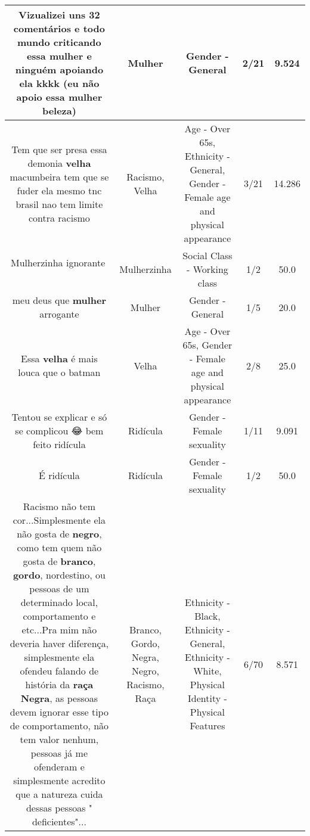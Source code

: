 \documentclass[11pt]{article}
\newlength\mylength
\begin{document}
\begin{center}
\begin{longtable}{|C{.65\mylength}|C{.30\mylength}|C{.12\mylength}|C{.12\mylength}|C{.12\mylength}|}
  \small Vizualizei uns 32 comentários e todo mundo criticando essa \textbf{mulher} e ninguém apoiando ela kkkk (eu não apoio essa \textbf{mulher} beleza)\normalsize   & Mulher & Gender - General & 2/21 & 9.524 \\  \hline
  \small Tem que ser presa essa demonia \textbf{v\textbf{elha}} macumbeira tem que se fuder ela mesmo tnc brasil nao tem limite contra racismo\normalsize   & Racismo, Velha & Age - Over 65s, Ethnicity - General, Gender - Female age and physical appearance & 3/21 & 14.286 \\  \hline
  \small Mulherzinha ignorante🤮🤮🤮\normalsize   & Mulherzinha & Social Class - Working class & 1/2 & 50.0 \\  \hline
  \small meu deus que \textbf{mulher} arrogante\normalsize   & Mulher & Gender - General & 1/5 & 20.0 \\  \hline
  \small Essa \textbf{v\textbf{elha}} é mais louca que o batman\normalsize   & Velha & Age - Over 65s, Gender - Female age and physical appearance & 2/8 & 25.0 \\  \hline
  \small Tentou se explicar e só se complicou 😂 bem feito ridícula\normalsize   & Ridícula & Gender - Female sexuality & 1/11 & 9.091 \\  \hline
  \small É ridícula\normalsize   & Ridícula & Gender - Female sexuality & 1/2 & 50.0 \\  \hline
  \small Racismo não tem cor...Simplesmente ela não gosta de \textbf{negro}, como tem quem não gosta de \textbf{branco}, \textbf{gordo}, nordestino, ou pessoas de um determinado local, comportamento e etc...Pra mim não deveria haver diferença, simplesmente ela ofendeu falando de história da \textbf{raça} \textbf{Negra}, as pessoas devem ignorar esse tipo de comportamento, não tem valor nenhum, pessoas já me ofenderam e simplesmente acredito que a natureza cuida dessas pessoas " deficientes"...\normalsize   & Branco, Gordo, Negra, Negro, Racismo, Raça & Ethnicity - Black, Ethnicity - General, Ethnicity - White, Physical Identity - Physical Features & 6/70 & 8.571 \\  \hline

\end{longtable}
\end{center}
\end{document}
